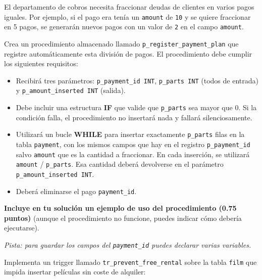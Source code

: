 \documentclass[a4paper,11pt]{article}
\begin{document}
\begin{Form}
\vspace{0.4cm}

\begin{tcolorbox}[title={Ejercicio 1 (3.25 + 0.75 puntos) - Procedimiento con bucle}]
El departamento de cobros necesita fraccionar deudas de clientes en varios pagos iguales. Por ejemplo, si el pago era tenía un \texttt{amount} de \texttt{10} y se quiere fraccionar en 5 pagos, se generarán nuevos pagos con un valor de \texttt{2} en el campo \texttt{amount}.

Crea un procedimiento almacenado llamado \texttt{p\_register\_payment\_plan} que registre automáticamente esta división de pagos. El procedimiento debe cumplir los siguientes requisitos:

\begin{itemize}
    \item Recibirá tres parámetros: \texttt{p\_payment\_id INT}, \texttt{p\_parts INT} (todos de entrada) y \texttt{p\_amount\_inserted INT} (salida).
    \item Debe incluir una estructura \textbf{IF} que valide que \texttt{p\_parts} sea mayor que 0. Si la condición falla, el procedimiento no insertará nada y fallará silenciosamente.
    \item Utilizará un bucle \textbf{WHILE} para insertar exactamente \texttt{p\_parts} filas en la tabla \texttt{payment}, con los mismos campos que hay en el registro \texttt{p\_payment\_id} salvo \texttt{amount} que es la cantidad a fraccionar. En cada inserción, se utilizará \texttt{amount} / \texttt{p\_parts}. 
    Esa cantidad deberá devolverse en el parámetro \texttt{p\_amount\_inserted INT}.
    \item Deberá eliminarse el pago \texttt{payment\_id}.
\end{itemize}

\textbf{Incluye en tu solución un ejemplo de uso del procedimiento (0.75 puntos)} (aunque el procedimiento no funcione, puedes indicar cómo debería ejecutarse).

\textit{Pista: para guardar los campos del \texttt{payment\_id} puedes declarar varias variables.}


\end{tcolorbox}
\vspace{0.4cm}

\begin{tcolorbox}[title={Ejercicio 2 (3 puntos) - Trigger de validación}]
Implementa un trigger llamado \texttt{tr\_prevent\_free\_rental} sobre la tabla \texttt{film} que impida insertar películas sin coste de alquiler:


\end{tcolorbox}
\end{Form}
\end{document}
